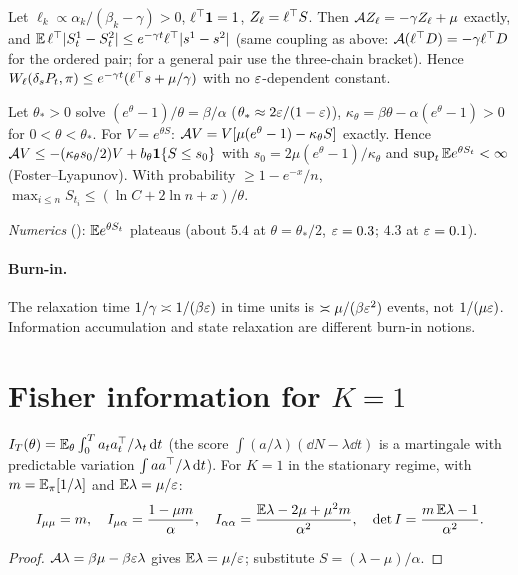 \begin{lemma}\label{lem:ellcontr}\Pt{}
Let $\ell_k\propto\alpha_k/(\beta_k-\gamma)>0$, $\ell^{\top}\mathbf1=1$, $Z_\ell=\ell^{\top} S$. Then $\mathcal A Z_\ell=-\gamma Z_\ell+\mu$ exactly, and
$\mathbb{E}\,\ell^{\top}|S^1_t-S^2_t|\le e^{-\gamma t}\ell^{\top}|s^1-s^2|$ (same coupling as above: $\mathcal A(\ell^{\top} D)=-\gamma\ell^{\top} D$ for the ordered pair; for a general pair use the three-chain bracket). Hence $W_\ell(\delta_sP_t,\pi)\le e^{-\gamma t}(\ell^{\top} s+\mu/\gamma)$ with no $\varepsilon$-dependent constant.
\end{lemma}

\begin{lemma}[$K=1$ exponential moments up to $\theta_*$]\label{lem:E0}\Pt{}
Let $\theta_*>0$ solve $(e^\theta-1)/\theta=\beta/\alpha$ ($\theta_*\approx2\varepsilon/(1-\varepsilon)$), $\kappa_\theta=\beta\theta-\alpha(e^\theta-1)>0$ for $0<\theta<\theta_*$.
For $V=e^{\theta S}$: $\mathcal A V=V[\mu(e^\theta-1)-\kappa_\theta S]$ exactly. Hence $\mathcal A V\le-(\kappa_\theta s_0/2)V+b_\theta\mathbf 1\{S\le s_0\}$ with $s_0=2\mu(e^\theta-1)/\kappa_\theta$ and $\sup_t\mathbb{E} e^{\theta S_t}<\infty$ (Foster--Lyapunov).
With probability $\ge1-e^{-x}/n$, $\max_{i\le n}S_{t_i}\le(\ln C+2\ln n+x)/\theta$.
\end{lemma}
\emph{Numerics} (\Nt{}): $\mathbb{E} e^{\theta S_t}$ plateaus (about $5.4$ at $\theta=\theta_*/2$, $\varepsilon=0.3$; $4.3$ at $\varepsilon=0.1$).

\paragraph{Burn-in.} The relaxation time $1/\gamma\asymp1/(\beta\varepsilon)$ in time units is $\asymp\mu/(\beta\varepsilon^2)$ events, not $1/(\mu\varepsilon)$. Information accumulation and state relaxation are different burn-in notions.

\section{Fisher information for $K=1$}\label{sec:fisherK1}

\begin{lemma}[reduction]\label{lem:reduction}\Pt{}
$I_T(\theta)=\mathbb{E}_\theta\int_0^Ta_ta_t^{\top}/\lambda_t\,\mathrm d t$ (the score $\int(a/\lambda)(\dd N-\lambda\dd t)$ is a martingale with predictable variation $\int aa^{\top}/\lambda\,\mathrm d t$).
For $K=1$ in the stationary regime, with $m=\mathbb{E}_\pi[1/\lambda]$ and $\mathbb{E}\lambda=\mu/\varepsilon$:
\[
I_{\mu\mu}=m,\quad I_{\mu\alpha}=\frac{1-\mu m}{\alpha},\quad I_{\alpha\alpha}=\frac{\mathbb{E}\lambda-2\mu+\mu^2m}{\alpha^2},\quad \det I=\frac{m\,\mathbb{E}\lambda-1}{\alpha^2}.
\]
\end{lemma}
\begin{proof}
$\mathcal A\lambda=\beta\mu-\beta\varepsilon\lambda$ gives $\mathbb{E}\lambda=\mu/\varepsilon$; substitute $S=(\lambda-\mu)/\alpha$.
\end{proof}

